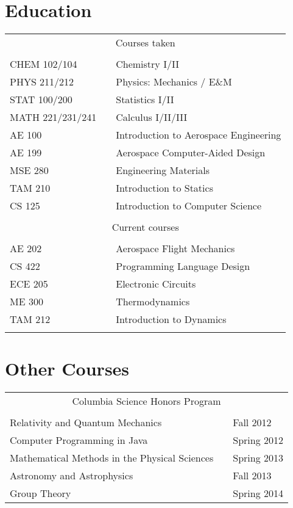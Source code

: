 \documentclass[margin]{res}
\begin{document}
\begin{resume}
\newpage

\section{Education}
  \begin{tabular}{l p{1in} l}
    \\
    \multicolumn{3}{c}{Courses taken} \\
    \\
    CHEM 102/104 & \hfill & Chemistry I/II \\
    PHYS 211/212 & \hfill & Physics: Mechanics / E\&M \\
    STAT 100/200 & \hfill & Statistics I/II \\
    MATH 221/231/241 & \hfill & Calculus I/II/III \\
    AE 100 & \hfill & Introduction to Aerospace Engineering \\
    AE 199 & \hfill & Aerospace Computer-Aided Design \\
    MSE 280 & \hfill & Engineering Materials \\
    TAM 210 & \hfill & Introduction to Statics \\
    CS 125 & \hfill & Introduction to Computer Science \\
    \\
    \multicolumn{3}{c}{Current courses} \\
    \\
    AE 202 & \hfill & Aerospace Flight Mechanics \\
    CS 422 & \hfill & Programming Language Design \\
    ECE 205 & \hfill & Electronic Circuits \\
    ME 300 & \hfill & Thermodynamics \\
    TAM 212 & \hfill & Introduction to Dynamics \\
    \\
  \end{tabular}

\section{Other Courses}
  \begin{tabular}{l p{1in} l}
    \\
    \multicolumn{3}{c}{Columbia Science Honors Program} \\
    \\
    Relativity and Quantum Mechanics & \hfill & Fall 2012 \\
    Computer Programming in Java & \hfill & Spring 2012 \\
    Mathematical Methods in the Physical Sciences & \hfill & Spring 2013 \\
    Astronomy and Astrophysics & \hfill & Fall 2013 \\
    Group Theory & \hfill & Spring 2014 \\
  \end{tabular}

\end{resume}
\end{document}

